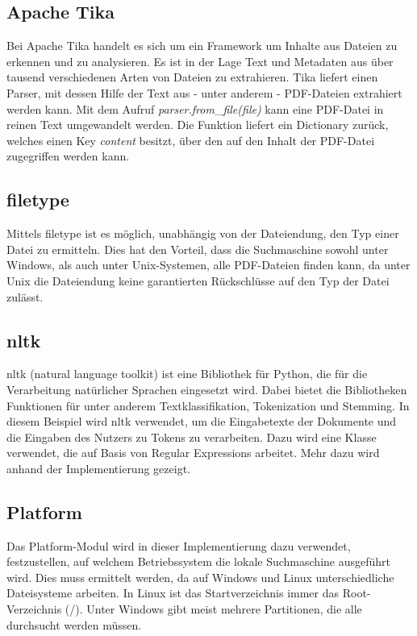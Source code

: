 \subsection*{Apache Tika}\label{apache-tika}

Bei Apache Tika handelt es sich um ein Framework um Inhalte aus Dateien zu erkennen und zu analysieren. Es ist in der Lage Text und Metadaten aus über tausend verschiedenen Arten von Dateien zu extrahieren. Tika liefert einen Parser, mit dessen Hilfe der Text aus - unter anderem - PDF-Dateien extrahiert werden kann. Mit dem Aufruf \emph{parser.from}\_\emph{file(file)} kann eine PDF-Datei in reinen Text umgewandelt werden. Die Funktion liefert ein Dictionary zurück, welches einen Key \emph{content} besitzt, über den auf den Inhalt der PDF-Datei zugegriffen werden kann.

\subsection*{filetype}\label{python-magic}

Mittels filetype ist es möglich, unabhängig von der Dateiendung, den Typ einer Datei zu ermitteln. Dies hat den Vorteil, dass die Suchmaschine sowohl unter Windows, als auch unter Unix-Systemen, alle PDF-Dateien finden kann, da unter Unix die Dateiendung keine garantierten Rückschlüsse auf den Typ der Datei zulässt.

\subsection*{nltk}\label{nltk}
nltk (natural language toolkit) ist eine Bibliothek für Python, die für die Verarbeitung natürlicher Sprachen eingesetzt wird. Dabei bietet die Bibliotheken Funktionen für unter anderem Textklassifikation, Tokenization und Stemming.
In diesem Beispiel wird nltk verwendet, um die Eingabetexte der Dokumente und die Eingaben des Nutzers zu Tokens zu verarbeiten. Dazu wird eine Klasse verwendet, die auf Basis von Regular Expressions arbeitet. Mehr dazu wird anhand der Implementierung gezeigt. %

\subsection*{Platform}
Das Platform-Modul wird in dieser Implementierung dazu verwendet, festzustellen, auf welchem Betriebssystem die lokale Suchmaschine ausgeführt wird. Dies muss ermittelt werden, da auf Windows und Linux unterschiedliche Dateisysteme arbeiten. In Linux ist das Startverzeichnis immer das Root-Verzeichnis (\glqq /\grqq). Unter Windows gibt meist mehrere Partitionen, die alle durchsucht werden müssen.

